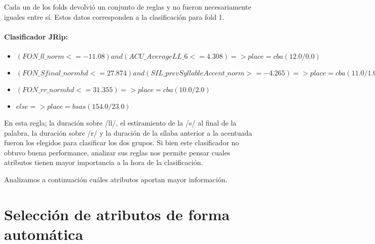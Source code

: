 Cada un de los folds devolvió un conjunto de reglas y no fueron necesariamente iguales entre sí. Estos datos corresponden a la clasificación para fold 1.

\paragraph*{Clasificador JRip:}

\begin{flushleft}
\begin{itemize}

\item $(FON\_ll\_norm <= -11.08) and (ACU\_AverageLL\_6 <= 4.308) => place=cba (12.0/0.0)$ \\
\item $(FON\_Sfinal\_normhd <= 27.874) and (SIL\_prevSyllableAccent\_norm >= -4.265) => place=cba (11.0/1.0)$ \\
\item $(FON\_rr\_normhd <= 31.355) => place=cba (10.0/2.0)$ \\
\item $ else  => place=bsas (154.0/23.0)$
\end{itemize}
\end{flushleft}

En esta regla; la duración sobre /ll/, el estiramiento de la /s/ al final de la palabra, la duración sobre /r/ y la duración de la sílaba anterior a la acentuada fueron los elegidos para clasificar los dos grupos. Si bien este clasificador no obtuvo buena performance, analizar sus reglas nos permite pensar cuales atributos tienen mayor importancia a la hora de la clasificación.

Analizamos a continuación cuáles atributos aportan mayor información.

\section{Selección de atributos de forma automática}



